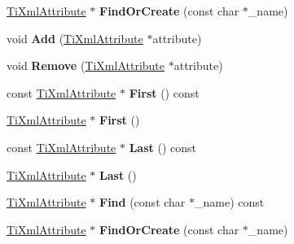 \begin{DoxyCompactItemize}
\item 
\hypertarget{class_ti_xml_attribute_set_a5e28f5d32f048fba85d04dc317495bdc}{\hyperlink{class_ti_xml_attribute}{Ti\+Xml\+Attribute} $\ast$ {\bfseries Find\+Or\+Create} (const char $\ast$\+\_\+name)}\label{class_ti_xml_attribute_set_a5e28f5d32f048fba85d04dc317495bdc}

\item 
\hypertarget{class_ti_xml_attribute_set_a745e50ddaae3bee93e4589321e0b9c1a}{void {\bfseries Add} (\hyperlink{class_ti_xml_attribute}{Ti\+Xml\+Attribute} $\ast$attribute)}\label{class_ti_xml_attribute_set_a745e50ddaae3bee93e4589321e0b9c1a}

\item 
\hypertarget{class_ti_xml_attribute_set_a924a73d071f2573f9060f0be57879c57}{void {\bfseries Remove} (\hyperlink{class_ti_xml_attribute}{Ti\+Xml\+Attribute} $\ast$attribute)}\label{class_ti_xml_attribute_set_a924a73d071f2573f9060f0be57879c57}

\item 
\hypertarget{class_ti_xml_attribute_set_ae0636e88cedd4b09d61c451860f68598}{const \hyperlink{class_ti_xml_attribute}{Ti\+Xml\+Attribute} $\ast$ {\bfseries First} () const }\label{class_ti_xml_attribute_set_ae0636e88cedd4b09d61c451860f68598}

\item 
\hypertarget{class_ti_xml_attribute_set_a99703bb08ca2aece2d7ef835de339ba0}{\hyperlink{class_ti_xml_attribute}{Ti\+Xml\+Attribute} $\ast$ {\bfseries First} ()}\label{class_ti_xml_attribute_set_a99703bb08ca2aece2d7ef835de339ba0}

\item 
\hypertarget{class_ti_xml_attribute_set_a7b3f3ccf39a97bc25539d3fcc540296a}{const \hyperlink{class_ti_xml_attribute}{Ti\+Xml\+Attribute} $\ast$ {\bfseries Last} () const }\label{class_ti_xml_attribute_set_a7b3f3ccf39a97bc25539d3fcc540296a}

\item 
\hypertarget{class_ti_xml_attribute_set_ab4c4edfb2d74f6ea31aae096743bd6e0}{\hyperlink{class_ti_xml_attribute}{Ti\+Xml\+Attribute} $\ast$ {\bfseries Last} ()}\label{class_ti_xml_attribute_set_ab4c4edfb2d74f6ea31aae096743bd6e0}

\item 
\hypertarget{class_ti_xml_attribute_set_a941aca775190f097b7eefb9e9f078a83}{\hyperlink{class_ti_xml_attribute}{Ti\+Xml\+Attribute} $\ast$ {\bfseries Find} (const char $\ast$\+\_\+name) const }\label{class_ti_xml_attribute_set_a941aca775190f097b7eefb9e9f078a83}

\item 
\hypertarget{class_ti_xml_attribute_set_adb975daec84e6d8a5ff93a85381e6e26}{\hyperlink{class_ti_xml_attribute}{Ti\+Xml\+Attribute} $\ast$ {\bfseries Find\+Or\+Create} (const char $\ast$\+\_\+name)}\label{class_ti_xml_attribute_set_adb975daec84e6d8a5ff93a85381e6e26}

\end{DoxyCompactItemize}


